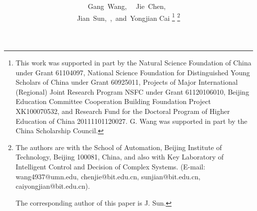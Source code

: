 \documentclass[journal]{IEEEtran}
\begin{document}
\newenvironment{centergpic}{}{\begin{center}~\box\graph~\end{center}}



\title{{\color{black}{Power Scheduling of Kalman Filtering in Wireless Sensor Networks with Data Packet Drops}}
}

\author{Gang~Wang,
~~Jie~Chen,~\\Jian~Sun,~,~and~Yongjian Cai
\thanks{This work was supported in part by the Natural Science Foundation of China under Grant 61104097, National Science Foundation for
Distinguished Young Scholars of China under Grant 60925011, Projects of Major International (Regional) Joint Research Program NSFC under Grant 61120106010, Beijing Education Committee Cooperation Building Foundation Project XK100070532, and Research Fund for the Doctoral Program of Higher Education of China 20111101120027. G. Wang was supported in part by
the China Scholarship Council.}
\thanks{The authors are with the School of Automation, Beijing Institute of Technology,
Beijing 100081, China, and also with Key Laboratory of Intelligent Control and Decision of Complex Systems. (E-mail: wang4937@umn.edu, chenjie@bit.edu.cn, sunjian@bit.edu.cn, caiyongjian@bit.edu.cn).

The corresponding author of this paper is J. Sun.

}
}

\iffalse
\and
\IEEEauthorblockN{Jie Chen}
\IEEEauthorblockA{School of Automation\\
Beijing Institute of Technology\\
Beijing, China\\
Email: chenjie@bit.edu.cn}
\and
\IEEEauthorblockN{Jian Sun}
\IEEEauthorblockA{School of Automation\\
Beijing Institute of Technology\\
Beijing, China\\
Telephone: (800) 555--1212\\
Fax: (888) 555--1212}\fi


\maketitle
\end{document}
